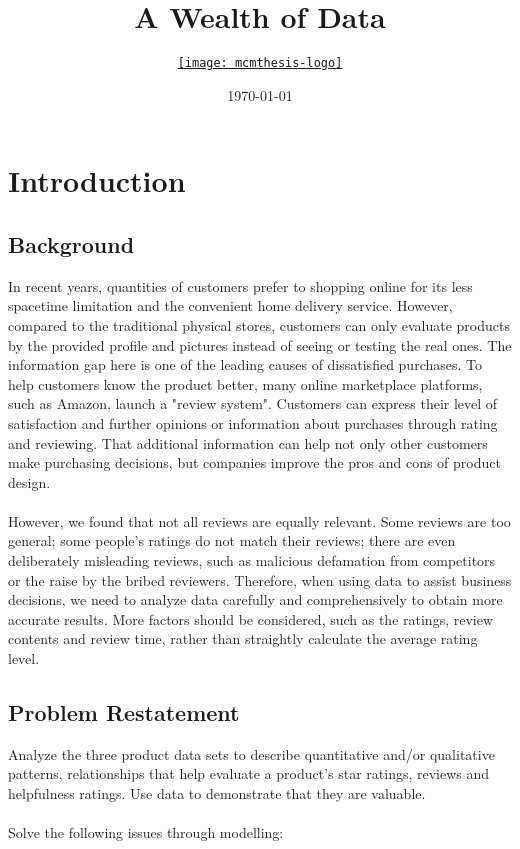 \documentclass{mcmthesis}
\title{A Wealth of Data}
\author{\small \href{http://www.latexstudio.net/}
  {\texttt{[image: mcmthesis-logo]}}}
\date{\today}
\begin{document}
\begin{abstract}
  \lipsum[1]
\end{abstract}
\maketitle
\tableofcontents
\newpage
\memodate{\today}
\begin{memo}[Letter]
  \lipsum[1]
\end{memo}

\section{Introduction}
\subsection{Background}
In recent years, quantities of customers prefer to shopping online for its less spacetime limitation and the convenient home delivery service. However, compared to the traditional physical stores, customers can only evaluate products by the provided profile and pictures instead of seeing or testing the real ones. The information gap here is one of the leading causes of dissatisfied purchases. To help customers know the product better, many online marketplace platforms, such as Amazon, launch a "review system". Customers can express their level of satisfaction and further opinions or information about purchases through rating and reviewing. That additional information can help not only other customers make purchasing decisions, but companies improve the pros and cons of product design.
\\\\
However, we found that not all reviews are equally relevant. Some reviews are too general; some people's ratings do not match their reviews; there are even deliberately misleading reviews, such as malicious defamation from competitors or the raise by the bribed reviewers. Therefore, when using data to assist business decisions, we need to analyze data carefully and comprehensively to obtain more accurate results. More factors should be considered, such as the ratings, review contents and review time, rather than straightly calculate the average rating level.
\subsection{Problem Restatement}
Analyze the three product data sets to describe quantitative and/or qualitative patterns, relationships that help evaluate a product's star ratings, reviews and helpfulness ratings. Use data to demonstrate that they are valuable.
\\\\
Solve the following issues through modelling:
\end{document}
